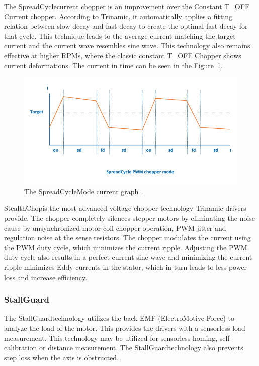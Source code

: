 The SpreadCycle\texttrademark current chopper is an improvement over the Constant T\_OFF Current chopper.
According to Trinamic, it automatically applies a fitting relation between slow decay and fast decay to create the optimal fast decay for that cycle\cite{trinamic_chopper_nodate}.
This technique leads to the average current matching the target current and the current wave resembles sine wave.
This technology also remains effective at higher RPMs, where the classic constant T\_OFF Chopper shows current deformations\cite{trinamic_chopper_nodate}.
The current in time can be seen in the Figure~\ref{fig:spread_cycle}.

\begin{figure}[H]
    \centering
    \includegraphics[width=\textwidth]{obrazky/spread_cycle}
    \caption{The SpreadCycle\texttrademark Mode current graph~\cite{trinamic_chopper_nodate}.}
    \label{fig:spread_cycle}
\end{figure}

StealthChop\texttrademark is the most advanced voltage chopper technology Trinamic drivers provide.
The chopper completely silences stepper motors by eliminating the noise cause by unsynchronized motor coil chopper operation, PWM jitter and regulation noise at the sense resistors\cite{trinamic_chopper_nodate}.
The chopper modulates the current using the PWM duty cycle, which minimizes the current ripple\cite{trinamic_chopper_nodate}.
Adjusting the PWM duty cycle also results in a perfect current sine wave and minimizing the current ripple minimizes Eddy currents in the stator, which in turn leads to less power loss and increase efficiency\cite{trinamic_chopper_nodate}.


\subsubsection{StallGuard\texttrademark}
The StallGuard\texttrademark technology utilizes the back EMF (ElectroMotive Force) to analyze the load of the motor.
This provides the drivers with a sensorless load measurement.
This technology may be utilized for sensorless homing, self-calibration or distance measurement.
The StallGuard\texttrademark technology also prevents step loss when the axis is obstructed\cite{trinamic_trinamic_nodate}.

